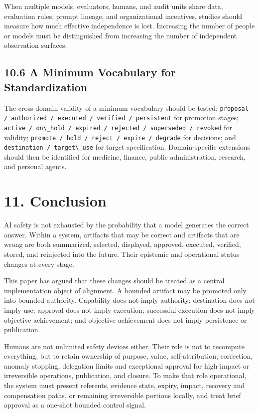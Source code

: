 When multiple models, evaluators, humans, and audit units share data, evaluation rules, prompt lineage, and organizational incentives, studies should measure how much effective independence is lost. Increasing the number of people or models must be distinguished from increasing the number of independent observation surfaces.

\subsection{10.6 A Minimum Vocabulary for Standardization}\label{a-minimum-vocabulary-for-standardization}

The cross-domain validity of a minimum vocabulary should be tested: \passthrough{\lstinline!proposal / authorized / executed / verified / persistent!} for promotion stages; \passthrough{\lstinline!active / on\_hold / expired / rejected / superseded / revoked!} for validity; \passthrough{\lstinline!promote / hold / reject / expire / degrade!} for decisions; and \passthrough{\lstinline!destination / target\_use!} for target specification. Domain-specific extensions should then be identified for medicine, finance, public administration, research, and personal agents.

\section{11. Conclusion}\label{conclusion}

AI safety is not exhausted by the probability that a model generates the correct answer. Within a system, artifacts that may be correct and artifacts that are wrong are both summarized, selected, displayed, approved, executed, verified, stored, and reinjected into the future. Their epistemic and operational status changes at every stage.

This paper has argued that these changes should be treated as a central implementation object of alignment. A bounded artifact may be promoted only into bounded authority. Capability does not imply authority; destination does not imply use; approval does not imply execution; successful execution does not imply objective achievement; and objective achievement does not imply persistence or publication.

Humans are not unlimited safety devices either. Their role is not to recompute everything, but to retain ownership of purpose, value, self-attribution, correction, anomaly stopping, delegation limits and exceptional approval for high-impact or irreversible operations, publication, and closure. To make that role operational, the system must present referents, evidence state, expiry, impact, recovery and compensation paths, or remaining irreversible portions locally, and treat brief approval as a one-shot bounded control signal.

